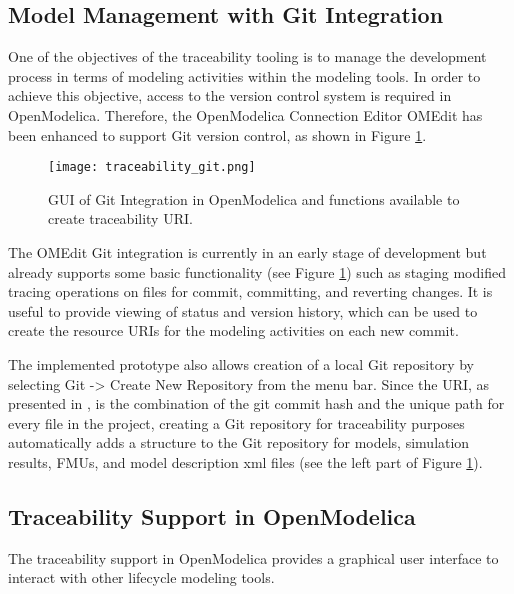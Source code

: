\subsection{Model Management with Git Integration}
\label{sec:tracaebilitygit}

One of the objectives of the traceability tooling is to manage the development process in terms of modeling
activities within the modeling tools. In order to achieve this objective, access to the version control system is
required in OpenModelica. Therefore, the OpenModelica Connection Editor OMEdit has been enhanced to support Git version 
control, as shown in Figure \ref{fig:traceabilitygit}.

\begin{figure}
	\texttt{[image: traceability\_git.png]}
	\caption{GUI of Git Integration in OpenModelica and functions available to create traceability URI.}
	\label{fig:traceabilitygit}
\end{figure}

The OMEdit Git integration is currently in an early stage of development but already supports some basic
functionality (see Figure \ref{fig:traceabilitygit}) such as staging modified tracing operations on files 
for commit, committing, and reverting changes. It is useful to provide viewing of status and version history, 
which can be used to create the resource URIs for the modeling activities on each new commit.

The implemented prototype also allows creation of a local Git repository by selecting Git -> Create New Repository from the menu bar. 
Since the URI, as presented in \cite{intocpsjohn}, is the combination of the git commit hash and the unique path for every file in the
project, creating a Git repository for traceability purposes automatically adds a structure to the Git repository for models, simulation results, FMUs, and model description \acrshort{xml} files (see the left
part of Figure \ref{fig:traceabilitygit}).

\subsection{Traceability Support in OpenModelica}
\label{subsec:traceabilityopenmodelica}

The traceability support in OpenModelica provides a graphical user interface to interact with other lifecycle
modeling tools.

